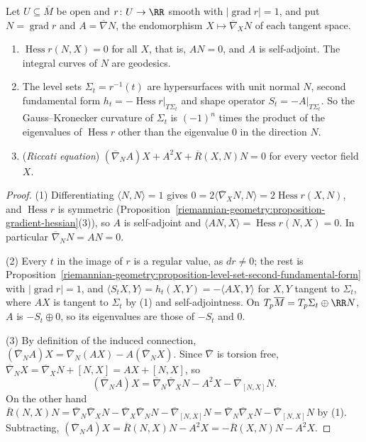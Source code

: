\begin{proposition}\label{riemannian-geometry:proposition-distance-function}
Let $U \subseteq \overline{M}$ be open and $r \colon U \to \RR$ smooth with $|\operatorname{grad}r| = 1$, and put $N = \operatorname{grad}r$ and $A = \overline{\nabla}N$, the endomorphism $X \mapsto \overline{\nabla}_XN$ of each tangent space.
\begin{enumerate}
\item $\operatorname{Hess}r(N, X) = 0$ for all $X$, that is, $AN = 0$, and $A$ is self-adjoint. The integral curves of $N$ are geodesics.
\item The level sets $\Sigma_t = r^{-1}(t)$ are hypersurfaces with unit normal $N$, second fundamental form $h_t = -\operatorname{Hess}r|_{T\Sigma_t}$ and shape operator $S_t = -A|_{T\Sigma_t}$. So the Gauss--Kronecker
curvature of $\Sigma_t$ is $(-1)^n$ times the product of the eigenvalues of $\operatorname{Hess}r$ other than the eigenvalue $0$ in the direction $N$.
\item (\emph{Riccati equation}) $(\overline{\nabla}_NA)X + A^2X + \overline{R}(X, N)N = 0$ for every vector field $X$.
\end{enumerate}
\end{proposition}

\begin{proof}
(1) Differentiating $\langle N, N\rangle = 1$ gives $0 = 2\langle\overline{\nabla}_XN, N\rangle = 2\operatorname{Hess}r(X, N)$, and $\operatorname{Hess}r$ is symmetric (Proposition~\ref{riemannian-geometry:proposition-gradient-hessian}(3)), so $A$ is
self-adjoint and $\langle AN, X\rangle = \operatorname{Hess}r(N, X) = 0$. In particular $\overline{\nabla}_NN = AN = 0$.

(2) Every $t$ in the image of $r$ is a regular value, as $dr \neq 0$; the rest is Proposition~\ref{riemannian-geometry:proposition-level-set-second-fundamental-form} with $|\operatorname{grad}r| = 1$, and
$\langle S_tX, Y\rangle = h_t(X, Y) = -\langle AX, Y\rangle$ for $X, Y$ tangent to $\Sigma_t$, where $AX$ is tangent to $\Sigma_t$ by (1) and self-adjointness. On $T_p\overline{M} = T_p\Sigma_t \oplus \RR N$, $A$ is
$-S_t \oplus 0$, so its eigenvalues are those of $-S_t$ and $0$.

(3) By definition of the induced connection, $(\overline{\nabla}_NA)X = \overline{\nabla}_N(AX) - A(\overline{\nabla}_NX)$. Since $\overline{\nabla}$ is torsion free, $\overline{\nabla}_NX = \overline{\nabla}_XN + [N, X] = AX + [N, X]$, so
\[
(\overline{\nabla}_NA)X = \overline{\nabla}_N\overline{\nabla}_XN - A^2X - \overline{\nabla}_{[N, X]}N .
\]
On the other hand $\overline{R}(N, X)N = \overline{\nabla}_N\overline{\nabla}_XN - \overline{\nabla}_X\overline{\nabla}_NN - \overline{\nabla}_{[N, X]}N = \overline{\nabla}_N\overline{\nabla}_XN - \overline{\nabla}_{[N, X]}N$ by (1).
Subtracting, $(\overline{\nabla}_NA)X = \overline{R}(N, X)N - A^2X = -\overline{R}(X, N)N - A^2X$.
\end{proof}

